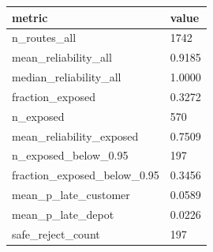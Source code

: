\begin{tabular}{ll}
 \hline
 metric & value \\
 \hline
 n_routes_all & 1742 \\
 mean_reliability_all & 0.9185 \\
 median_reliability_all & 1.0000 \\
 fraction_exposed & 0.3272 \\
 n_exposed & 570 \\
 mean_reliability_exposed & 0.7509 \\
 n_exposed_below_0.95 & 197 \\
 fraction_exposed_below_0.95 & 0.3456 \\
 mean_p_late_customer & 0.0589 \\
 mean_p_late_depot & 0.0226 \\
 safe_reject_count & 197 \\
 \hline
\end{tabular}
